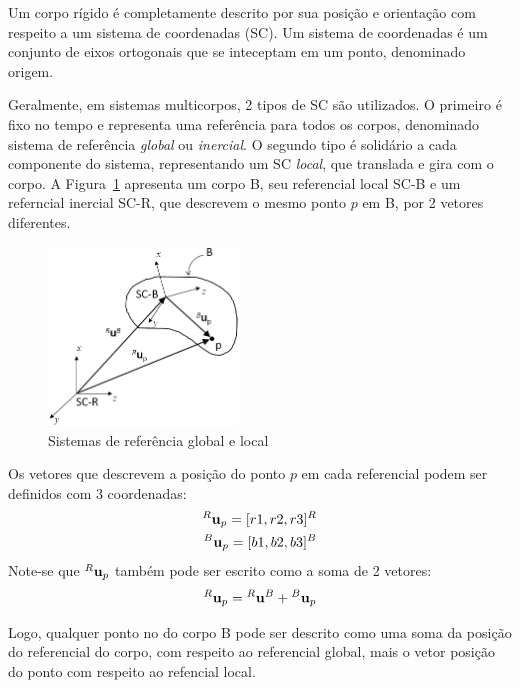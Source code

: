 Um corpo rígido é completamente descrito por sua posição e orientação com
respeito a um sistema de coordenadas (SC). Um sistema de coordenadas é um
conjunto de eixos ortogonais que se inteceptam em um ponto, denominado origem.

Geralmente, em sistemas multicorpos, 2 tipos de SC são utilizados. O primeiro é
fixo no tempo e representa uma referência para todos os corpos, denominado
sistema de referência \emph{global} ou \emph{inercial}. O segundo tipo é
solidário a cada componente do sistema, representando um SC \emph{local}, que
translada e gira com o corpo. A Figura~\ref{fig::sist_refs} apresenta um corpo
B, seu referencial local SC-B e um referncial inercial SC-R, que descrevem o mesmo
ponto $p$ em B, por 2 vetores diferentes.

\begin{figure}[h]
	\centering 
 	\includegraphics[width=0.45\textwidth]{figs/sist_refs}
 	\caption{Sistemas de referência global e local}
 	\label{fig::sist_refs}
\end{figure}

Os vetores que descrevem a posição do ponto $p$ em cada referencial podem ser
definidos com 3 coordenadas:
%
\begin{align}
	^{R}\textrm{\textbf{u}}_{p} = [r1, r2, r3]^{R} \\
	^{B}\textrm{\textbf{u}}_{p} = [b1, b2, b3]^{B}
\end{align}
%
Note-se que $^{R}\textrm{\textbf{u}}_{p}$ também pode ser escrito como a soma de
2 vetores:
%
\begin{equation}
	^{R}\textrm{\textbf{u}}_{p} = {}^{R}\textrm{\textbf{u}}^{B} + 
	{}^{B}\textrm{\textbf{u}}_{p}
\end{equation}
%

Logo, qualquer ponto no do corpo B pode ser descrito como uma soma da posição
do referencial do corpo, com respeito ao referencial global, mais o vetor posição
do ponto com respeito ao refencial local.

